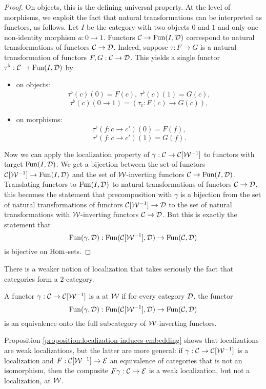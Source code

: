 \begin{proof}
On objects, this is the defining universal property. At the level of morphisms, we exploit the fact that natural transformations can be interpreted as functors, as follows. Let $I$ be the category with two objects $0$ and $1$ and only one non-identity morphism $a:0\to1$. Functors $\mathcal{C}\to\operatorname{Fun}(I,\mathcal{D})$ correspond to natural transformations of functors $\mathcal{C}\to\mathcal{D}$.
Indeed, suppose $\tau:F\to G$ is a natural transformation of functors $F,G:\mathcal{C}\to\mathcal{D}$. This yields a single functor $\tau^\flat:\mathcal{C}\to\operatorname{Fun}(I,\mathcal{D})$ by
\begin{itemize}[label={-}]
    \item on objects:
    \[\tau^\flat(c)(0)=F(c),\ \tau^\flat(c)(1)=G(c),\]
    \[\tau^\flat(c)(0\to1)=(\tau_c:F(c)\to G(c)),\]
    \item on morphisms:
    \[\tau^\flat(f:c\to c')(0)=F(f),\]
    \[\tau^\flat(f:c\to c')(1)=G(f).\]
\end{itemize}

Now we can apply the localization property of $\gamma:\mathcal{C}\to\mathcal{C}[\mathcal{W}^{-1}]$ to functors with target $\operatorname{Fun}(I,\mathcal{D})$. We get a bijection between the set of functors $\mathcal{C}[\mathcal{W}^{-1}]\to\operatorname{Fun}(I,\mathcal{D})$ and the set of $\mathcal{W}$-inverting functors $\mathcal{C}\to\operatorname{Fun}(I,\mathcal{D})$. Translating functors to $\operatorname{Fun}(I,\mathcal{D})$ to natural transformations of functors $\mathcal{C}\to\mathcal{D}$, this becomes the statement that precomposition with $\gamma$ is a bijection from the set of natural transformations of functors $\mathcal{C}[\mathcal{W}^{-1}]\to\mathcal{D}$ to the set of natural transformations with $\mathcal{W}$-inverting functors $\mathcal{C}\to\mathcal{D}$. But this is exactly the statement that
\[\operatorname{Fun}(\gamma,\mathcal{D}):\operatorname{Fun}(\mathcal{C}[\mathcal{W}^{-1}],\mathcal{D})\to\operatorname{Fun}(\mathcal{C},\mathcal{D})\]
is bijective on $\operatorname{Hom}$-sets.
\end{proof}

\begin{remark}
There is a weaker notion of localization that takes seriously the fact that categories form a $2$-category.

A functor $\gamma:\mathcal{C}\to\mathcal{C}[\mathcal{W}^{-1}]$ is a  at $\mathcal{W}$ if for every category $\mathcal{D}$, the functor
\[\operatorname{Fun}(\gamma,\mathcal{D}):\operatorname{Fun}(\mathcal{C}[\mathcal{W}^{-1}],\mathcal{D})\to\operatorname{Fun}(\mathcal{C},\mathcal{D})\]
is an equivalence onto the full subcategory of $\mathcal{W}$-inverting functors.

Proposition \ref{proposition:localization-induces-embedding} shows that localizations are weak localizations, but the latter are more general: if $\gamma:\mathcal{C}\to\mathcal{C}[\mathcal{W}^{-1}]$ is a localization and $F:\mathcal{C}[\mathcal{W}^{-1}]\to\mathcal{E}$ an equivalence of categories that is not an isomorphism, then the composite $F\gamma:\mathcal{C}\to\mathcal{E}$ is a weak localization, but not a localization, at $\mathcal{W}$.
\end{remark}

